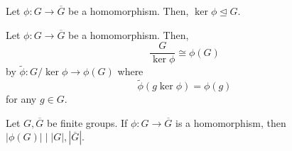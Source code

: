 \begin{corollary}
    Let \(\phi : G \to \overline{G}\) be a homomorphism. Then, \(\ker{\phi} \unlhd G\).
\end{corollary}

\begin{theorem}
    Let \(\phi : G \to \overline{G}\) be a homomorphism. Then,
    \[
        \frac{G}{\ker\phi} \cong \phi(G)
    \]
    by \(\tilde{\phi} : G/\ker\phi \to \phi(G)\) where
    \[
        \tilde{\phi} (g \ker\phi) = \phi(g)
    \]
    for any \(g \in G\).
\end{theorem}

\begin{corollary}
    Let \(G, \overline{G}\) be finite groups. If \(\phi : G \to \overline{G}\) is a homomorphism, then \(|\phi(G)| \mid |G|, |\overline{G}|\).
\end{corollary}
